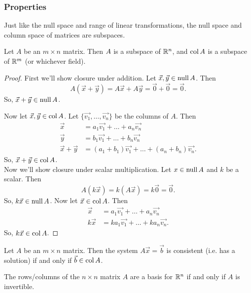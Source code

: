 \subsubsection{Properties}
Just like the null space and range of linear transformations, the null space and column space of matrices are subspaces.
\begin{theorem}
	Let $A$ be an $m \times n$ matrix.
	Then $\null{A}$ is a subspace of $\mathbb{R}^n$, and $\operatorname{col}{A}$ is a subspace of $\mathbb{R}^m$ (or whichever field).
\end{theorem}
\begin{proof}
	First we'll show closure under addition.
	Let $\vec{x}, \vec{y} \in \operatorname{null}{A}$.
	Then 
	\begin{equation*}
		A(\vec{x} + \vec{y}) = A\vec{x} + A\vec{y} = \vec{0} + \vec{0} = \vec{0}.
	\end{equation*}
	So, $\vec{x} + \vec{y} \in \operatorname{null}{A}$.
	
	Now let $\vec{x}, \vec{y} \in \operatorname{col}{A}$.
	Let $\{\vec{v_1}, \dots, \vec{v_n}\}$ be the columns of $A$.
	Then
	\begin{align*}
		\vec{x} &= a_1\vec{v_1} + \dots + a_n\vec{v_n} \\
		\vec{y} &= b_1\vec{v_1} + \dots + b_n\vec{v_n} \\
		\vec{x} + \vec{y} &= (a_1 + b_1)\vec{v_1} + \dots + (a_n + b_n)\vec{v_n}.
	\end{align*}
	So, $\vec{x} + \vec{y} \in \operatorname{col}{A}$. \\
	
	Now we'll show closure under scalar multiplication.
	Let $x \in \operatorname{null}{A}$ and $k$ be a scalar.
	Then
	\begin{equation*}
		A(k\vec{x}) = k(A\vec{x}) = k\vec{0} = \vec{0}.
	\end{equation*}
	So, $k\vec{x} \in \operatorname{null}{A}$.
	Now let $\vec{x} \in \operatorname{col}{A}$.
	Then
	\begin{align*}
		\vec{x} &= a_1\vec{v_1} + \dots + a_n\vec{v_n} \\
		k\vec{x} &= ka_1\vec{v_1} + \dots + ka_n\vec{v_n}.
	\end{align*}
	So, $k\vec{x} \in \operatorname{col}{A}$.
\end{proof}

\begin{theorem}
	Let $A$ be an $m \times n$ matrix.
	Then the system $A\vec{x} = \vec{b}$ is consistent (i.e. has a solution) if and only if $\vec{b} \in \operatorname{col}{A}$.
\end{theorem}

\begin{theorem}
	The rows/columns of the $n \times n$ matrix $A$ are a basis for $\mathbb{R}^n$ if and only if $A$ is invertible.
\end{theorem}


